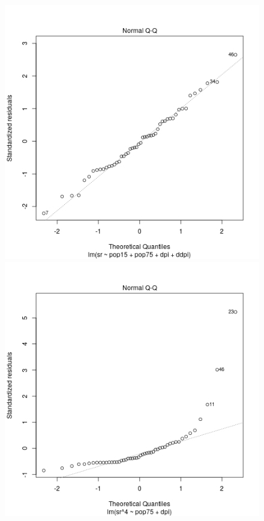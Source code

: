 \begin{figure}[p]
  \begin{center}
    \includegraphics[scale=0.48]{imgR/plot12.png} \hspace*{2cm}
	\includegraphics[scale=0.48]{imgR/plot22.png} \\

\end{center}
\end{figure}
